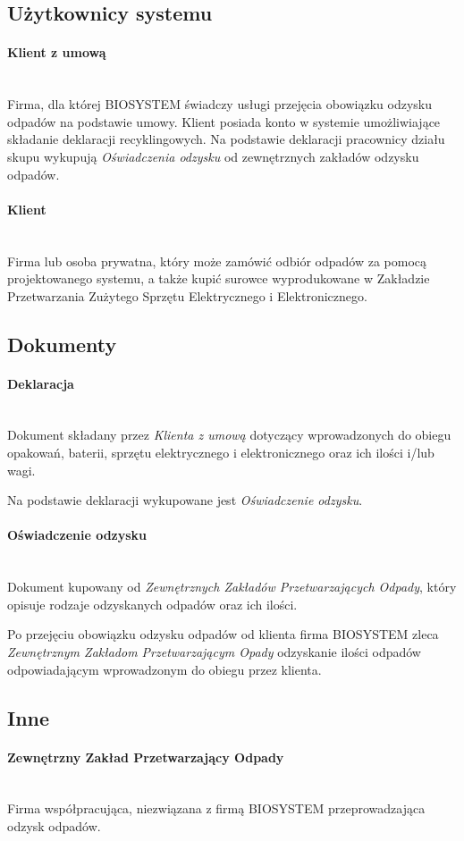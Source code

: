 \subsection{Użytkownicy systemu}

	\paragraph{Klient z umową}\ \\
	Firma, dla której BIOSYSTEM świadczy usługi przejęcia obowiązku odzysku odpadów na podstawie umowy. Klient posiada konto w systemie umożliwiające składanie deklaracji recyklingowych. Na podstawie deklaracji pracownicy działu skupu wykupują \emph{Oświadczenia odzysku} od zewnętrznych zakładów odzysku odpadów.

	\paragraph{Klient} \ \\
	Firma lub osoba prywatna, który może zamówić odbiór odpadów za pomocą projektowanego systemu, a także kupić surowce wyprodukowane w Zakładzie Przetwarzania Zużytego Sprzętu Elektrycznego i Elektronicznego.


\subsection{Dokumenty}
	\paragraph{Deklaracja} \ \\
	Dokument składany przez \emph{Klienta z umową} dotyczący wprowadzonych do obiegu opakowań, baterii, sprzętu elektrycznego i elektronicznego oraz ich ilości i/lub wagi.

	Na podstawie deklaracji wykupowane jest \emph{Oświadczenie odzysku}.

	\paragraph{Oświadczenie odzysku} \ \\
	Dokument kupowany od \emph{Zewnętrznych Zakładów Przetwarzających Odpady}, który opisuje rodzaje odzyskanych odpadów oraz ich ilości.

	Po przejęciu obowiązku odzysku odpadów od klienta firma BIOSYSTEM zleca \emph{Zewnętrznym Zakładom Przetwarzającym Opady} odzyskanie ilości odpadów odpowiadającym wprowadzonym do obiegu przez klienta.

\subsection{Inne}
	\paragraph{Zewnętrzny Zakład Przetwarzający Odpady} \ \\
	Firma współpracująca, niezwiązana z firmą BIOSYSTEM przeprowadzająca odzysk odpadów.
